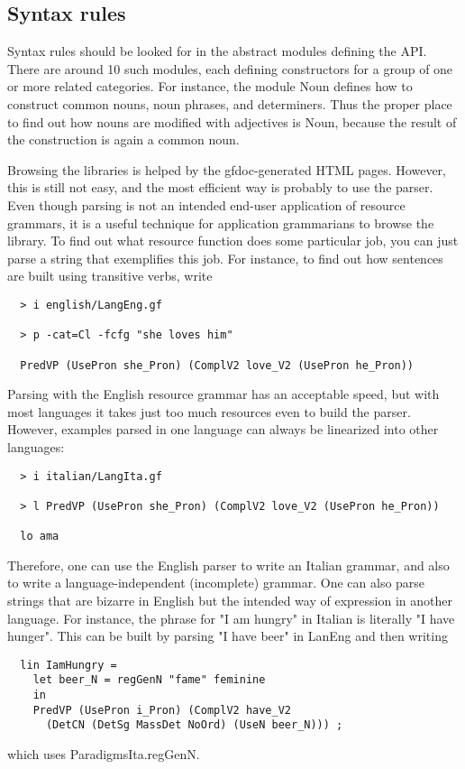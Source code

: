 \documentclass[11pt,a4paper]{article}
\begin{document}
\subsection{Syntax rules}
Syntax rules should be looked for in the abstract modules defining the
API. There are around 10 such modules, each defining constructors for
a group of one or more related categories. For instance, the module
Noun defines how to construct common nouns, noun phrases, and determiners.
Thus the proper place to find out how nouns are modified with adjectives
is Noun, because the result of the construction is again a common noun.

Browsing the libraries is helped by the gfdoc-generated HTML pages. 
However, this is still not easy, and the most efficient way is 
probably to use the parser.
Even though parsing is not an intended end-user application 
of resource grammars, it is a useful technique for application grammarians
to browse the library. To find out what resource function does some
particular job, you can just parse a string that exemplifies this job. For
instance, to find out how sentences are built using transitive verbs, write

\begin{verbatim}
  > i english/LangEng.gf
 
  > p -cat=Cl -fcfg "she loves him"

  PredVP (UsePron she_Pron) (ComplV2 love_V2 (UsePron he_Pron))
\end{verbatim}
Parsing with the English resource grammar has an acceptable speed, but
with most languages it takes just too much resources even to build the
parser. However, examples parsed in one language can always be linearized into
other languages:

\begin{verbatim}
  > i italian/LangIta.gf

  > l PredVP (UsePron she_Pron) (ComplV2 love_V2 (UsePron he_Pron))

  lo ama
\end{verbatim}
Therefore, one can use the English parser to write an Italian grammar, and also
to write a language-independent (incomplete) grammar. One can also parse strings
that are bizarre in English but the intended way of expression in another language.
For instance, the phrase for "I am hungry" in Italian is literally "I have hunger".
This can be built by parsing "I have beer" in LanEng and then writing

\begin{verbatim}
  lin IamHungry = 
    let beer_N = regGenN "fame" feminine 
    in
    PredVP (UsePron i_Pron) (ComplV2 have_V2 
      (DetCN (DetSg MassDet NoOrd) (UseN beer_N))) ;
\end{verbatim}
which uses ParadigmsIta.regGenN. 
\end{document}
